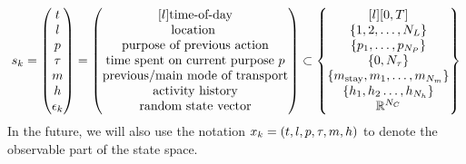 \begin{equation}
    \s{k} = \begin{pmatrix}
    t \\
    l \\
    p \\
    \atime\\
    m \\
    \amem \\
    \epsilon_k
    \end{pmatrix} =
    \begin{pmatrix*}[l]
    \text{time-of-day} \\
    \text{location } \\
    \text{purpose of previous action} \\
    \text{time spent on current purpose $p$} \\
    \text{previous/main mode of transport} \\
    \text{activity history} \\
    \text{random state vector}
    \end{pmatrix*}
    \subset
    \begin{Bmatrix*}[l]
    [0,T] \\
    \{1,2,\dots, N_L\} \\
    \{p_1,\dots,p_{N_P}\} \\
    \{0,N_{\atime}\} \\
    \{m_{\text{stay}},m_1,\dots,m_{N_m}\} \\
    \{\amem_1,\amem_2\dots,\amem_{N_\amem} \}\\
    \rr^{N_C}
    \end{Bmatrix*}
\end{equation}
In the future, we will also use the notation $x_k=(t,l,p,\tau,m,h)$ to denote the observable part of the state space.
